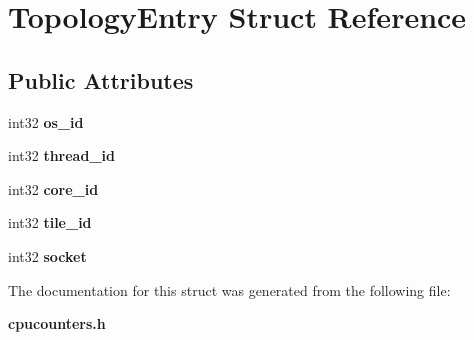\section{Topology\+Entry Struct Reference}
\label{structTopologyEntry}
\subsection*{Public Attributes}
\begin{DoxyCompactItemize}
\item 
\mbox{\label{structTopologyEntry_aa960a8bbdd754740d781072ae1266eed}} 
int32 {\bfseries os\+\_\+id}
\item 
\mbox{\label{structTopologyEntry_a1db41da84b81248561c0c0b00739939f}} 
int32 {\bfseries thread\+\_\+id}
\item 
\mbox{\label{structTopologyEntry_aee7bef9e2b54f9617a697a43068a5c27}} 
int32 {\bfseries core\+\_\+id}
\item 
\mbox{\label{structTopologyEntry_a620e9508cdcd78b979ffaabe2581afd1}} 
int32 {\bfseries tile\+\_\+id}
\item 
\mbox{\label{structTopologyEntry_a9b217468c64b3072b48ad5466742827e}} 
int32 {\bfseries socket}
\end{DoxyCompactItemize}


The documentation for this struct was generated from the following file\+:\begin{DoxyCompactItemize}
\item 
\textbf{ cpucounters.\+h}\end{DoxyCompactItemize}
